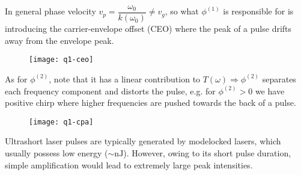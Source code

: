 \begin{parts}
%	
	
	
	\newpage
	In general phase velocity $v_p = \dfrac{\omega_0}{k(\omega_0)} \neq v_g$, so what $\phi^{(1)}$ is responsible for is introducing the carrier-envelope offset (CEO) where the peak of a pulse drifts away from the envelope peak.
	\begin{figure}[H]
		\centering
		\texttt{[image: q1-ceo]}
	\end{figure}
	
	As for $\phi^{(2)}$, note that it has a linear contribution to $T(\omega) \Rightarrow \phi^{(2)}$ separates each frequency component and distorts the pulse, e.g. for $\phi^{(2)} > 0$ we have positive chirp where higher frequencies are pushed towards the back of a pulse.
	\begin{figure}[H]
		\centering
		\texttt{[image: q1-cpa]}
	\end{figure}
	
	Ultrashort laser pulses are typically generated by modelocked lasers, which usually possess low energy ($\sim \unit{\nano\joule}$).
	However, owing to its short pulse duration, simple amplification would lead to extremely large peak intensities.
	

\end{parts}
